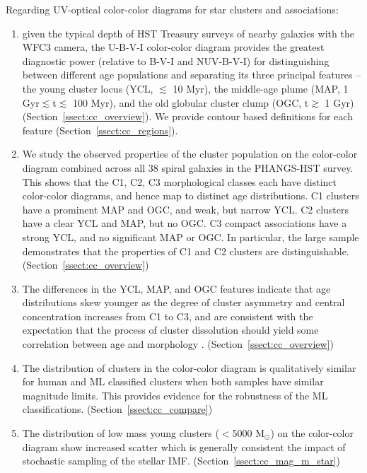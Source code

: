\documentclass[]{aastex631}
\begin{document}
Regarding UV-optical color-color diagrams for star clusters and associations:
\begin{enumerate}  
\item given the typical depth of HST Treasury surveys of nearby galaxies with the WFC3 camera, the U-B-V-I color-color diagram provides the greatest diagnostic power (relative to B-V-I and NUV-B-V-I) for distinguishing between different age populations and separating its three principal features --  the young cluster locus (YCL, $\lesssim$ 10 Myr), the middle-age plume (MAP, 1 Gyr$\lesssim$t$\lesssim$ 100 Myr), and the old globular cluster clump (OGC, t$\gtrsim$ 1 Gyr) (Section~\ref{ssect:cc_overview}).  We provide contour based definitions for each feature (Section~\ref{ssect:cc_regions}). 
\item We study the observed properties of the cluster population on the color-color diagram combined across all 38 spiral galaxies in the PHANGS-HST survey.  This shows that the C1, C2, C3 morphological classes each have distinct color-color diagrams, and hence map to distinct age distributions.  C1 clusters have a prominent MAP and OGC, and weak, but narrow YCL.  C2 clusters have a clear YCL and MAP, but no OGC.  C3 compact associations have a strong YCL, and no significant MAP or OGC. In particular, the large sample demonstrates that the properties of C1 and C2 clusters are distinguishable. (Section~\ref{ssect:cc_overview})  
\item The differences in the YCL, MAP, and OGC features indicate that age distributions skew younger as the degree of cluster asymmetry and central concentration increases from C1 to C3, and are consistent with the expectation that the process of cluster dissolution should yield some correlation between age and morphology \citep[e.g.,][and references therein]{adamo_legacy_2017, whitmore_star_2021, cook23}. (Section~\ref{ssect:cc_overview})
\item  The distribution of clusters in the color-color diagram is qualitatively similar for human and ML classified clusters when both samples have similar magnitude limits.  This provides evidence for the robustness of the ML classifications.  (Section~\ref{ssect:cc_compare})
\item The distribution of low mass young clusters ($<$5000 M$_\odot$) on the color-color diagram show increased scatter which is generally consistent the impact of stochastic sampling of the stellar IMF.  (Section~\ref{ssect:cc_mag_m_star})
\end{enumerate}
\end{document}
